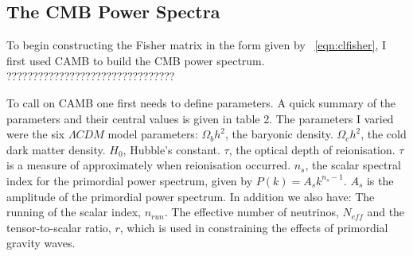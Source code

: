 \subsection{The CMB Power Spectra}

To begin constructing the Fisher matrix in the form given by ~\ref{eqn:clfisher}, I first used CAMB to build the CMB power spectrum. ????????????????????????????????

To call on CAMB one first needs to define parameters. A quick summary of the parameters and their central values is given in table 2. The parameters I varied were the six $\Lambda CDM$ model parameters: $\Omega_{b}h^{2}$, the baryonic density. $\Omega_{c}h^{2}$, the cold dark matter density. $H_0$, Hubble's constant. $\tau$, the optical depth of reionisation. $\tau$ is a measure of approximately when reionisation occurred. $n_s$, the scalar spectral index for the primordial power spectrum, given by $P(k) = A_s k^{n_s - 1}$. $A_s$ is the amplitude of the primordial power spectrum. In addition we also have: The running of the scalar index, $n_{run}$. The effective number of neutrinos, $N_{eff}$ and the tensor-to-scalar ratio, $r$, which is used in constraining the effects of primordial gravity waves.

